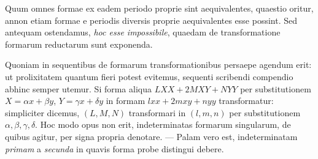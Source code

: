 Quum omnes formae ex eadem periodo proprie sint aequivalentes, quaestio oritur, annon etiam formae e periodis diversis proprie aequivalentes esse possint. Sed antequam ostendamus, \textit{hoc esse impossibile}, quaedam de transformatione formarum reductarum sunt exponenda.

Quoniam in sequentibus de formarum transformationibus persaepe agendum erit: ut prolixitatem quantum fieri potest evitemus, sequenti scribendi compendio abhinc semper utemur. Si forma aliqua $LXX+2MXY+NYY$ per substitutionem $X=\alpha x+\beta y$, $Y=\gamma x+\delta y$ in formam $lxx+2mxy+nyy$ transformatur: simpliciter dicemus, $(L,M,N)$ transformari in $(l,m,n)$ per substitutionem $\alpha,\beta,\gamma,\delta$. Hoc modo opus non erit, indeterminatas formarum singularum, de quibus agitur, per signa propria denotare. --- Palam vero est, indeterminatam \textit{primam} a \textit{secunda} in quavis forma probe distingui debere.

